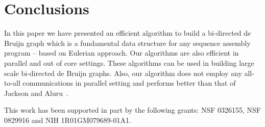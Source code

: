 \documentclass[11pt,conference,twocolumn]{IEEEtran}
\begin{document}
\section{Conclusions}
In this paper we have presented an efficient algorithm to build a bi-directed de Bruijn graph which is a fundamental
data structure for any sequence assembly program -- based on Eulerian approach. Our algorithms are also efficient
 in parallel and out of core settings. These algorithms can be used in building large scale bi-directed de Bruijn graphs. 
Also, our algorithm does not employ any all-to-all communications in parallel setting and performs better than that
of Jackson and Aluru~\cite{par_bidirected_graph}.


 This work has been supported in
part by the following grants: NSF 0326155, NSF 0829916 and NIH
1R01GM079689-01A1.


\end{document}
